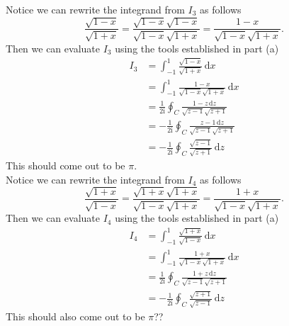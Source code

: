 \documentclass[10pt]{amsart}
\newcommand{\D}{\mathrm{d}}
\newcommand{\I}{\mathrm{i}}
\theoremstyle{nonumberplain}
\begin{document}
\begin{enumerate}[label={\bf {\arabic*}:}]
\begin{enumerate}
\noindent
Notice we can rewrite the integrand from $I_3$ as follows
$$
\frac{\sqrt{1 -x}}{ \sqrt{1 + x}} = \frac{\sqrt{1 -x}\sqrt{1 -x}}{\sqrt{1 -x}\sqrt{1 + x}} = \frac{1 - x}{\sqrt{1 - x}\sqrt{1 + x}}.
$$
Then we can evaluate $I_3$ using the tools established in part (a)
\begin{align*}
I_3 &= \int_{-1}^1 \frac{\sqrt{1 -x}}{ \sqrt{1 + x}}\, \D x \\
	&= \int_{-1}^1 \frac{1 - x}{\sqrt{1 - x}\sqrt{1 + x}}\, \D x \\
	&= \frac{1}{2\I} \oint_C \frac{1 - z\, \D z}{\sqrt{z -1} \sqrt{z + 1}} \\
	&= - \frac{1}{2\I} \oint_C \frac{z - 1\, \D z}{\sqrt{z -1} \sqrt{z + 1}} \\
	&= - \frac{1}{2\I} \oint_C \frac{\sqrt{z - 1}}{\sqrt{z + 1}}\, \D z
\end{align*}
This should come out to be $\pi$. \\

\noindent
Notice we can rewrite the integrand from $I_4$ as follows
$$
\frac{\sqrt{1 + x}}{ \sqrt{1- x}} = \frac{\sqrt{1+ x}\sqrt{1+ x}}{\sqrt{1- x}\sqrt{1 + x}} = \frac{1 + x}{\sqrt{1 - x}\sqrt{1 + x}}.
$$
Then we can evaluate $I_4$ using the tools established in part (a)
\begin{align*}
I_4 &= \int_{-1}^1 \frac{\sqrt{1 + x}}{ \sqrt{1- x}}\, \D x \\
	&= \int_{-1}^1 \frac{1 + x}{\sqrt{1 - x}\sqrt{1 + x}}\, \D x \\
	&= \frac{1}{2\I} \oint_C \frac{1 + z\, \D z}{\sqrt{z -1} \sqrt{z + 1}} \\
	&= - \frac{1}{2\I} \oint_C \frac{\sqrt{z + 1}}{\sqrt{z - 1}}\, \D z
\end{align*}
This should also come out to be $\pi$?? \\
\end{enumerate}
\newpage


\end{enumerate}
\end{document}
